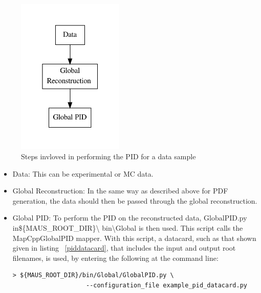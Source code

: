 \begin{figure}[h!]
\begin{center} 
\includegraphics[width=2in]{reconstruction/globalpid/pidperfflow.pdf} 
\caption{Steps invloved in performing the PID for a data sample}
\label{pidperf}
\end{center} 
\end{figure}
			
\begin{itemize}
\item Data: This can be experimental or MC data.
\item Global Reconstruction: In the same way as described above for PDF generation, the 
data should then be passed through the global reconstruction.
\item Global PID: To perform the PID on the reconstructed data, GlobalPID.py in\linebreak\$\{MAUS\_ROOT\_DIR\}\textbackslash 
bin\textbackslash Global is then used. This script calls the 
MapCppGlobalPID mapper. With this script, a datacard, such as that 
shown given in listing ~\ref{piddatacard}, that includes the input and output root filenames, is used, by entering the following at the command line:
\begin{verbatim}
> ${MAUS_ROOT_DIR}/bin/Global/GlobalPID.py \
                    --configuration_file example_pid_datacard.py
\end{verbatim}
\end{itemize}

